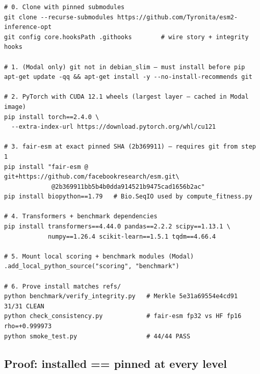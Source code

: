 \documentclass[11pt,a4paper]{article}
\begin{document}
\begin{lstlisting}[style=shell,caption={%
  Installation sequence. Steps match the Modal image build
  (\texttt{modal\_app.py:33--64}) and the local venv setup exactly.
}]
# 0. Clone with pinned submodules
git clone --recurse-submodules https://github.com/Tyronita/esm2-inference-opt
git config core.hooksPath .githooks        # wire story + integrity hooks

# 1. (Modal only) git not in debian_slim — must install before pip
apt-get update -qq && apt-get install -y --no-install-recommends git

# 2. PyTorch with CUDA 12.1 wheels (largest layer — cached in Modal image)
pip install torch==2.4.0 \
  --extra-index-url https://download.pytorch.org/whl/cu121

# 3. fair-esm at exact pinned SHA (2b369911) — requires git from step 1
pip install "fair-esm @ git+https://github.com/facebookresearch/esm.git\
             @2b369911bb5b4b0dda914521b9475cad1656b2ac"
pip install biopython==1.79   # Bio.SeqIO used by compute_fitness.py

# 4. Transformers + benchmark dependencies
pip install transformers==4.44.0 pandas==2.2.2 scipy==1.13.1 \
            numpy==1.26.4 scikit-learn==1.5.1 tqdm==4.66.4

# 5. Mount local scoring + benchmark modules (Modal)
.add_local_python_source("scoring", "benchmark")

# 6. Prove install matches refs/
python benchmark/verify_integrity.py   # Merkle 5e31a69554e4cd91  31/31 CLEAN
python check_consistency.py            # fair-esm fp32 vs HF fp16  rho=+0.999973
python smoke_test.py                   # 44/44 PASS
\end{lstlisting}

\subsection{Proof: installed == pinned at every level}
\end{document}

